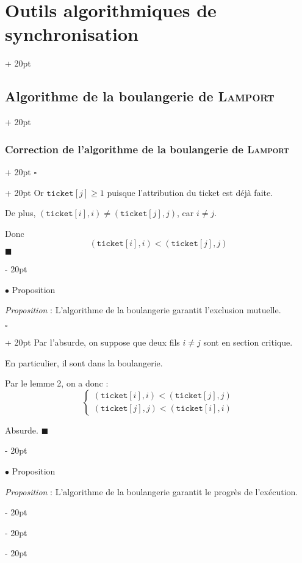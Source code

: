 \documentclass[a4paper, 12pt, twoside]{article}
\renewcommand{\ge}{\geqslant}
\newcommand{\ind}[1][20pt]{\advance\leftskip + #1}
\newcommand{\deind}[1][20pt]{\advance\leftskip - #1}
\newenvironment{indt}[2][20pt]{#2 \par \ind[#1]}{\par \deind} %
\newenvironment{proof}[1][{}]{\begin{indt}{$\square$ #1}}{$\blacksquare$ \end{indt}}
\begin{document}
\begin{indt}{\section{Outils algorithmiques de synchronisation}}
\begin{indt}{\subsection{Algorithme de la boulangerie de \textsc{Lamport}}}
\begin{indt}{\subsubsection{Correction de l'algorithme de la boulangerie de \textsc{Lamport}}}
\begin{proof}
                    Or $\mathtt{ticket}[j] \ge 1$ puisque l'attribution du ticket est déjà faite.

                    De plus, $(\mathtt{ticket}[i], i) \neq (\mathtt{ticket}[j], j)$, car $i \neq j$.

                    Donc
                    \[
                        (\mathtt{ticket}[i], i) < (\mathtt{ticket}[j], j)
                    \]
                \end{proof}

                \vspace{12pt}
                
                $\bullet$ Proposition

                \begin{pseudocode}
                    \textit{Proposition} :
                    L'algorithme de la boulangerie garantit l'exclusion mutuelle.
                \end{pseudocode}

                \vspace{6pt}
                
                \begin{proof}
                    Par l'absurde, on suppose que deux fils $i \neq j$ sont en section critique.

                    En particulier, il sont dans la boulangerie.

                    Par le lemme 2, on a donc :
                    \[
                        \begin{cases}
                            (\mathtt{ticket}[i], i) < (\mathtt{ticket}[j], j)
                            \\
                            (\mathtt{ticket}[j], j) < (\mathtt{ticket}[i], i)
                        \end{cases}
                    \]

                    Absurde.
                \end{proof}

                \vspace{12pt}
                
                $\bullet$ Proposition

                \begin{pseudocode}
                    \textit{Proposition} :
                    L'algorithme de la boulangerie garantit le progrès de l'exécution.
                \end{pseudocode}


\end{indt}
\end{indt}
\end{indt}
\end{document}
